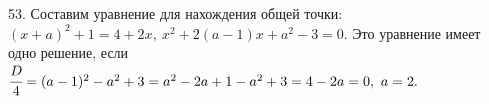53. Составим уравнение для нахождения общей точки: $(x+a)^2+1=4+2x,\ x^2+2(a-1)x+a^2-3=0.$ Это уравнение имеет одно решение, если $\cfrac{D}{4}=(a-1)^2-a^2+3=
a^2-2a+1-a^2+3=4-2a=0,\ a=2.$\\
